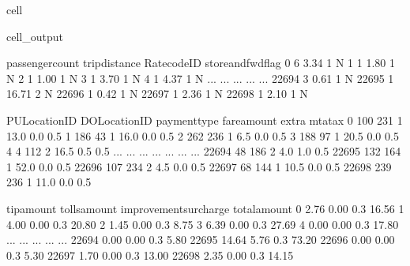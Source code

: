 \documentclass[letterpaper,10pt,english]{sphinxmanual}
\begin{document}
\begin{sphinxuseclass}{cell}
\begin{sphinxuseclass}{cell_output}
\begin{sphinxVerbatim}[commandchars=\\\{\}]
       passenger\PYGZus{}count  trip\PYGZus{}distance  RatecodeID store\PYGZus{}and\PYGZus{}fwd\PYGZus{}flag  \PYGZbs{}
0                    6           3.34           1                  N   
1                    1           1.80           1                  N   
2                    1           1.00           1                  N   
3                    1           3.70           1                  N   
4                    1           4.37           1                  N   
...                ...            ...         ...                ...   
22694                3           0.61           1                  N   
22695                1          16.71           2                  N   
22696                1           0.42           1                  N   
22697                1           2.36           1                  N   
22698                1           2.10           1                  N   

       PULocationID  DOLocationID  payment\PYGZus{}type  fare\PYGZus{}amount  extra  mta\PYGZus{}tax  \PYGZbs{}
0               100           231             1         13.0    0.0      0.5   
1               186            43             1         16.0    0.0      0.5   
2               262           236             1          6.5    0.0      0.5   
3               188            97             1         20.5    0.0      0.5   
4                 4           112             2         16.5    0.5      0.5   
...             ...           ...           ...          ...    ...      ...   
22694            48           186             2          4.0    1.0      0.5   
22695           132           164             1         52.0    0.0      0.5   
22696           107           234             2          4.5    0.0      0.5   
22697            68           144             1         10.5    0.0      0.5   
22698           239           236             1         11.0    0.0      0.5   

       tip\PYGZus{}amount  tolls\PYGZus{}amount  improvement\PYGZus{}surcharge  total\PYGZus{}amount  \PYGZbs{}
0            2.76          0.00                    0.3         16.56   
1            4.00          0.00                    0.3         20.80   
2            1.45          0.00                    0.3          8.75   
3            6.39          0.00                    0.3         27.69   
4            0.00          0.00                    0.3         17.80   
...           ...           ...                    ...           ...   
22694        0.00          0.00                    0.3          5.80   
22695       14.64          5.76                    0.3         73.20   
22696        0.00          0.00                    0.3          5.30   
22697        1.70          0.00                    0.3         13.00   
22698        2.35          0.00                    0.3         14.15   


\end{sphinxVerbatim}
\end{sphinxuseclass}
\end{sphinxuseclass}
\end{document}
